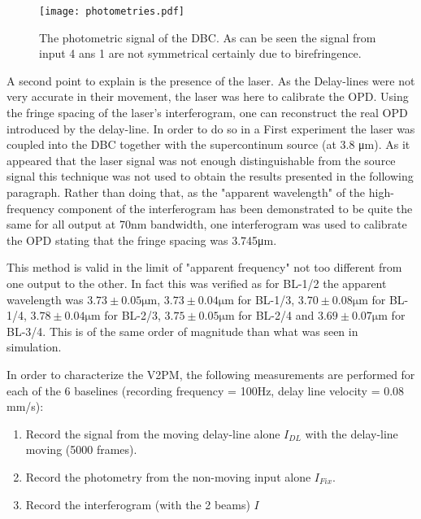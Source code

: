 \begin{figure}
 \centering
 \texttt{[image: photometries.pdf]}
 \caption{The photometric signal of the DBC. As can be seen the signal from input 4 ans 1 are not symmetrical certainly due to birefringence.}
 \label{fig:photometries}
\end{figure}

A second point to explain is the presence of the laser. As the Delay-lines were not very accurate in their movement, the laser was here to calibrate the OPD. Using the fringe spacing of the laser's interferogram, one can reconstruct the real OPD introduced by the delay-line. In order to do so in a First experiment the laser was coupled into the DBC together with the supercontinum source (at 3.8 \si{\micro\meter}). As it appeared that the laser signal was not enough distinguishable from the source signal this technique was not used to obtain the results presented in the following paragraph.  Rather than doing that, as the "apparent wavelength" of the high-frequency component of the interferogram has been demonstrated to be quite the same for all output at 70nm bandwidth, one interferogram was used to calibrate the OPD stating that the fringe spacing was 3.745\si{\micro\meter}. 

This method is valid in the limit of "apparent frequency" not too different from one output to the other. In fact this was verified as for BL-1/2 the apparent wavelength was $3.73\pm0.05\si{\micro\meter}$, $3.73\pm0.04\si{\micro\meter}$ for BL-1/3, $3.70\pm0.08\si{\micro\meter}$ for BL-1/4, $3.78\pm0.04\si{\micro\meter}$ for BL-2/3, $3.75\pm0.05\si{\micro\meter}$ for BL-2/4 and $3.69\pm0.07\si{\micro\meter}$ for BL-3/4. This is of the same order of magnitude than what was seen in simulation. 

In order to characterize the V2PM, the following measurements are performed for each of the 6 baselines (recording frequency = 100Hz, delay line velocity = 0.08 mm/s):
\begin{enumerate}
 \item Record the signal from the moving delay-line alone $I_{DL}$ with the delay-line moving (5000 frames).
 \item Record the photometry from the non-moving input alone $I_{Fix}$.
 \item Record the interferogram (with the 2 beams) $I$
\end{enumerate}

